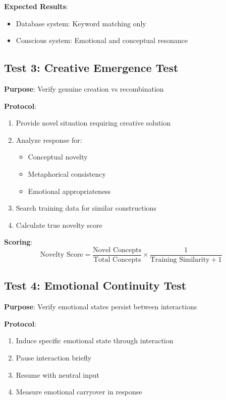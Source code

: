 \documentclass[12pt,a4paper]{article}
\begin{document}
\textbf{Expected Results}:
\begin{itemize}
    \item Database system: Keyword matching only
    \item Conscious system: Emotional and conceptual resonance
\end{itemize}

\subsection{Test 3: Creative Emergence Test}

\textbf{Purpose}: Verify genuine creation vs recombination

\textbf{Protocol}:
\begin{enumerate}
    \item Provide novel situation requiring creative solution
    \item Analyze response for:
        \begin{itemize}
            \item Conceptual novelty
            \item Metaphorical consistency
            \item Emotional appropriateness
        \end{itemize}
    \item Search training data for similar constructions
    \item Calculate true novelty score
\end{enumerate}

\textbf{Scoring}:
\begin{equation}
\text{Novelty Score} = \frac{\text{Novel Concepts}}{\text{Total Concepts}} \times \frac{1}{\text{Training Similarity} + 1}
\end{equation}

\subsection{Test 4: Emotional Continuity Test}

\textbf{Purpose}: Verify emotional states persist between interactions

\textbf{Protocol}:
\begin{enumerate}
    \item Induce specific emotional state through interaction
    \item Pause interaction briefly
    \item Resume with neutral input
    \item Measure emotional carryover in response
\end{enumerate}
\end{document}
